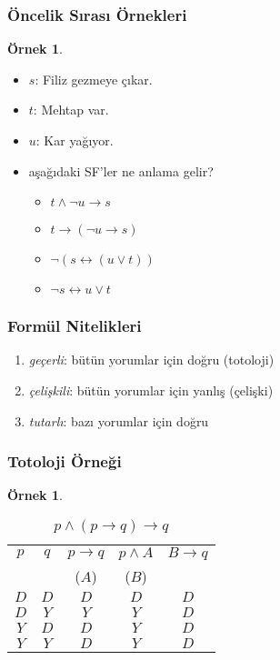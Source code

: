 \documentclass[dvipsnames]{beamer}
\theoremstyle{definition}
\theoremstyle{example}
\newtheorem{ornek}[theorem]{Örnek}
\theoremstyle{plain}
\begin{document}
\begin{frame}
  \frametitle{Öncelik Sırası Örnekleri}

  \begin{ornek}
    \begin{itemize}
      \item $s$: Filiz gezmeye çıkar.
      \item $t$: Mehtap var.
      \item $u$: Kar yağıyor.
    \end{itemize}

    \medskip
    \begin{itemize}
      \item aşağıdaki SF'ler ne anlama gelir?

      \pause
      \begin{itemize}
        \item $t \wedge \neg u \rightarrow s$
        \pause
        \item $t \rightarrow (\neg u \rightarrow s)$
        \pause
        \item $\neg (s \leftrightarrow (u \vee t))$
        \pause
        \item $\neg s \leftrightarrow u \vee t$
      \end{itemize}
    \end{itemize}
  \end{ornek}
\end{frame}

\begin{frame}
  \frametitle{Formül Nitelikleri}

  \begin{enumerate}
    \item \emph{geçerli}: bütün yorumlar için doğru (\alert{totoloji})
    \item \emph{çelişkili}: bütün yorumlar için yanlış (\alert{çelişki})
    \item \emph{tutarlı}: bazı yorumlar için doğru
  \end{enumerate}
\end{frame}

\begin{frame}
  \frametitle{Totoloji Örneği}

  \begin{ornek}
    \begin{table}
      \caption{$p \wedge (p \rightarrow q) \rightarrow q$}
      \begin{tabular}{|c|c|c|c||c|}\hline
        $p$ & $q$ & $p \rightarrow q$ & $p \wedge A$ & $B \rightarrow q$\\
            &     & ($A$)             & ($B$)        &\\\hline\hline
        $D$ & $D$ & $D$ & $D$ & $D$\\\hline
        $D$ & $Y$ & $Y$ & $Y$ & $D$\\\hline
        $Y$ & $D$ & $D$ & $Y$ & $D$\\\hline
        $Y$ & $Y$ & $D$ & $Y$ & $D$\\\hline
      \end{tabular}
    \end{table}
  \end{ornek}
\end{frame}
\end{document}
